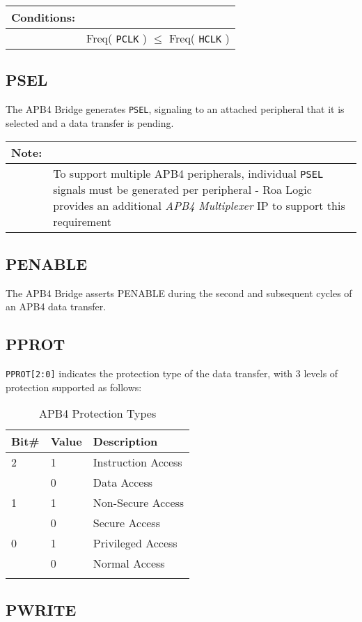 \begin{longtable}[]{@{}|rp{12cm}@{}}
	\textbf{Conditions}: & \\
	\endhead
	 & Freq( \texttt{PCLK} ) $\leqslant$ Freq( \texttt{HCLK} )\\
\end{longtable}	

\subsection{PSEL}\label{psel}

The APB4 Bridge generates \texttt{PSEL}, signaling to an attached peripheral that
it is selected and a data transfer is pending.

\begin{longtable}[]{@{}|p{2cm}p{12cm}@{}}
\textbf{Note:} & \\
\endhead
& To support multiple APB4 peripherals, individual \texttt{PSEL}
signals must be generated per peripheral - Roa Logic provides an
additional \emph{APB4 Multiplexer} IP to support this
requirement\tabularnewline

\end{longtable}

\subsection{PENABLE}\label{penable}

The APB4 Bridge asserts PENABLE during the second and
subsequent cycles of an APB4 data transfer.

\subsection{PPROT}\label{pprot}

\texttt{PPROT[2:0]} indicates the protection type of the data transfer, with
3 levels of protection supported as follows:

\begin{longtable}[]{@{}lll@{}}
\toprule
Bit\# & Value & Description\tabularnewline
\midrule
\endhead
2 & 1 & Instruction Access\tabularnewline
& 0 & Data Access\tabularnewline
1 & 1 & Non-Secure Access\tabularnewline
& 0 & Secure Access\tabularnewline
0 & 1 & Privileged Access\tabularnewline
& 0 & Normal Access\tabularnewline
\bottomrule
\caption{APB4 Protection Types}
\end{longtable}

\subsection{PWRITE}\label{pwrite}

